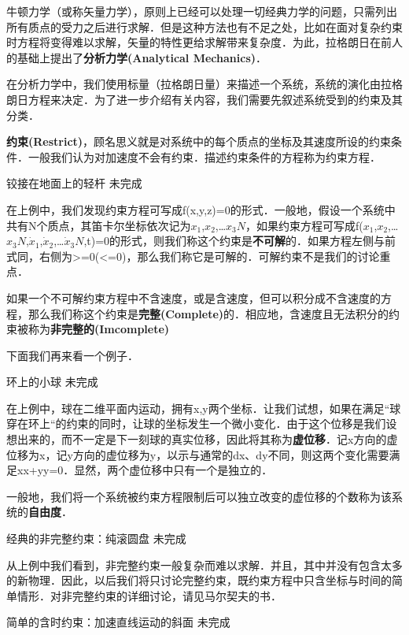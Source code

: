 
\begin{issues}
\issueDraft
\issueTODO
\end{issues}


牛顿力学（或称矢量力学），原则上已经可以处理一切经典力学的问题，只需列出所有质点的受力之后进行求解．但是这种方法也有不足之处，比如在面对复杂约束时方程将变得难以求解，矢量的特性更给求解带来复杂度．为此，拉格朗日在前人的基础上提出了\textbf{分析力学(Analytical Mechanics)}．

在分析力学中，我们使用标量（拉格朗日量）来描述一个系统，系统的演化由拉格朗日方程来决定．为了进一步介绍有关内容，我们需要先叙述系统受到的约束及其分类．

\textbf{约束(Restrict)}，顾名思义就是对系统中的每个质点的坐标及其速度所设的约束条件．一般我们认为对加速度不会有约束．描述约束条件的方程称为约束方程．

\begin{example}{铰接在地面上的轻杆}
未完成
\end{example}

在上例中，我们发现约束方程可写成f(x,y,z)=0的形式．一般地，假设一个系统中共有N个质点，其笛卡尔坐标依次记为$x
_1$,$x_2$,…$x_3N$，如果约束方程可写成f($x_1$,$x_2$,…$x_3N$,$\dot x_1$,$\dot x_2$,…$\dot x_3N$,t)=0的形式，则我们称这个约束是\textbf{不可解}的．如果方程左侧与前式同，右侧为>=0(<=0)，那么我们称它是可解的．可解约束不是我们的讨论重点．

如果一个不可解约束方程中不含速度，或是含速度，但可以积分成不含速度的方程，那么我们称这个约束是\textbf{完整(Complete)}的．相应地，含速度且无法积分的约束被称为\textbf{非完整的(Imcomplete)}

下面我们再来看一个例子．

\begin{example}{环上的小球}
未完成
\end{example}

在上例中，球在二维平面内运动，拥有x,y两个坐标．让我们试想，如果在满足“球穿在环上“的约束的同时，让球的坐标发生一个微小变化．由于这个位移是我们设想出来的，而不一定是下一刻球的真实位移，因此将其称为\textbf{虚位移}．记x方向的虚位移为\delta x，记y方向的虚位移为\delta y，以示与通常的dx、dy不同，则这两个变化需要满足x\delta x+y\delta y=0．显然，两个虚位移中只有一个是独立的．

一般地，我们将一个系统被约束方程限制后可以独立改变的虚位移的个数称为该系统的\textbf{自由度}．

\begin{example}{经典的非完整约束：纯滚圆盘}
未完成
\end{example}

从上例中我们看到，非完整约束一般复杂而难以求解．并且，其中并没有包含太多的新物理．因此，以后我们将只讨论完整约束，既约束方程中只含坐标与时间的简单情形．对非完整约束的详细讨论，请见马尔契夫的书．

\begin{example}{简单的含时约束：加速直线运动的斜面}
未完成
\end{example}